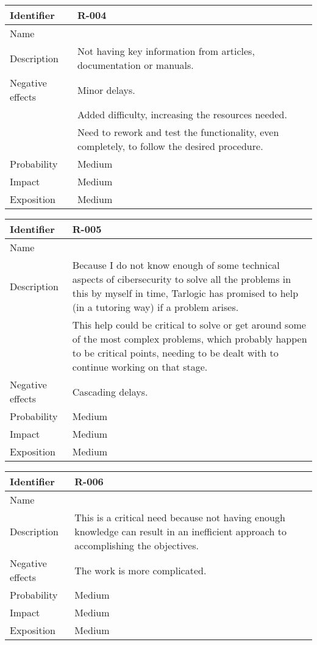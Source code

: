 \begin{table}[H]
	\begin{tabularx}{\textwidth}{|l|X|}
		\hline
		\rowcolor{gray!30}
		Identifier & \textbf{R-004} \\ \hline
		Name & \Rcuatro \\ \hline
		Description & Not having key information from articles, documentation or manuals.\\ \hline
		Negative effects
			& Minor delays. \\
			& Added difficulty, increasing the resources needed. \\
			& Need to rework and test the functionality, even completely, to follow the desired procedure.\\ \hline
		Probability & Medium\\ \hline
		Impact &  Medium\\ \hline
		Exposition &  Medium\\ \hline
	\end{tabularx}
\end{table}

\begin{table}[H]
	\begin{tabularx}{\textwidth}{|l|X|}
		\hline
		\rowcolor{gray!30}
		Identifier & \textbf{R-005} \\ \hline
		Name & \Rcinco \\ \hline
		Description
			& Because I do not know enough of some technical aspects of cibersecurity to solve all the problems in this by myself in time, Tarlogic has promised to help (in a tutoring way) if a problem arises. \\
			& This help could be critical to solve or get around some of the most complex problems, which probably happen to be critical points, needing to be dealt with to continue working on that stage.\\ \hline
		Negative effects
			& Cascading delays. \\ \hline
		Probability & Medium\\ \hline
		Impact &  Medium\\ \hline
		Exposition &  Medium\\ \hline
	\end{tabularx}
\end{table}

\begin{table}[H]
	\begin{tabularx}{\textwidth}{|l|X|}
		\hline
		\rowcolor{gray!30}
		Identifier & \textbf{R-006} \\ \hline
		Name & \Rseis \\ \hline
		Description & This is a critical need because not having enough knowledge can result in an inefficient approach to accomplishing the objectives.\\ \hline
		Negative effects
			& The work is more complicated. \\ \hline
		Probability & Medium\\ \hline
		Impact &  Medium\\ \hline
		Exposition &  Medium\\ \hline
	\end{tabularx}
\end{table}

